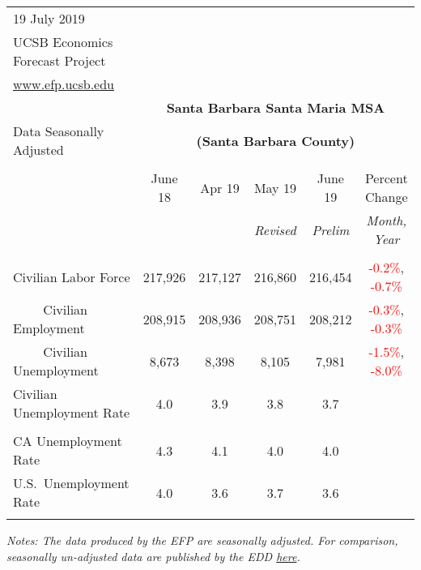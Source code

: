 \documentclass[12pt]{article}
\begin{document}
\begin{table}
\begin{tabular}{|l|c|c|c|c|c|}
\multicolumn{1}{l}{\small 19 July 2019} & \multicolumn{5}{c}{} \\
\multicolumn{1}{l}{\small UCSB Economics Forecast Project} & \multicolumn{5}{c}{} \\
\multicolumn{1}{l}{\small \href{http://www.efp.ucsb.edu/}{www.efp.ucsb.edu}} & \multicolumn{5}{c}{} \\
\multicolumn{1}{c}{} & \multicolumn{5}{c}{\large \textbf{Santa Barbara Santa Maria MSA}} \\
\multicolumn{1}{l}{\small Data Seasonally Adjusted} & \multicolumn{5}{c}{\small \textbf{(Santa Barbara County)}} \\ \hline \hline
& & & & & \\
 & June 18 & Apr 19 & May 19 & June 19 & Percent Change \\
 & & & \small \textit{Revised} & \small \textit{Prelim} & \small \textit{Month, Year} \\ \hline
& & & & & \\
Civilian Labor Force & 217,926 & 217,127 & 216,860 & 216,454 & \textcolor{red}{-0.2\%}, \textcolor{red}{-0.7\%} \\
$\qquad$ \small Civilian Employment & 208,915 & 208,936 & 208,751 & 208,212 & \textcolor{red}{-0.3\%}, \textcolor{red}{-0.3\%} \\
$\qquad$ \small Civilian Unemployment & 8,673 & 8,398 & 8,105 & 7,981 & \textcolor{red}{-1.5\%}, \textcolor{red}{-8.0\%} \\
Civilian Unemployment Rate & 4.0 & 3.9 & 3.8 & 3.7 & \\
& & & & & \\
CA Unemployment Rate & 4.3 & 4.1 & 4.0 & 4.0 & \\
U.S.\ Unemployment Rate & 4.0 & 3.6 & 3.7 & 3.6 & \\
& & & & & \\ \hline \hline
\end{tabular}
\par
\vspace{.5em}
\footnotesize
\textit{Notes: The data produced by the EFP are seasonally adjusted. For comparison, seasonally un-adjusted data are published by the EDD \href{http://www.labormarketinfo.ca.gov/file/lfmonth/satb$pds.pdf}{here}.}
\end{table}
\end{document}
